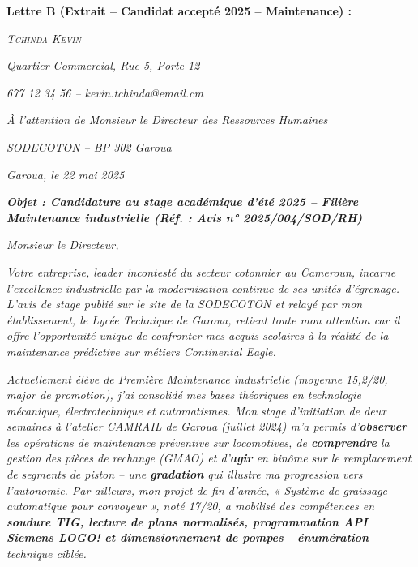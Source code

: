 \documentclass[11pt]{article}
\begin{document}
\begin{exoresolu}
\par
\textbf{Lettre B (Extrait -- Candidat accepté 2025 -- Maintenance) :}
\par
\emph{\textsc{Tchinda Kevin}}
\par
\emph{Quartier Commercial, Rue 5, Porte 12}
\par
\emph{677 12 34 56 -- kevin.tchinda@email.cm}
\par
\vspace{0.2cm}
\par
\emph{À l'attention de Monsieur le Directeur des Ressources Humaines}
\par
\emph{SODECOTON -- BP 302 Garoua}
\par
\vspace{0.2cm}
\par
\emph{Garoua, le 22 mai 2025}
\par
\vspace{0.2cm}
\par
\emph{\textbf{Objet : Candidature au stage académique d'été 2025 -- Filière Maintenance industrielle (Réf. : Avis n° 2025/004/SOD/RH)}}
\par
\vspace{0.3cm}
\par
\emph{Monsieur le Directeur,}
\par
\emph{Votre entreprise, leader incontesté du secteur cotonnier au Cameroun, incarne l'excellence industrielle par la modernisation continue de ses unités d'égrenage. L'avis de stage publié sur le site de la SODECOTON et relayé par mon établissement, le Lycée Technique de Garoua, retient toute mon attention car il offre l'opportunité unique de confronter mes acquis scolaires à la réalité de la maintenance prédictive sur métiers Continental Eagle.}
\par
\emph{Actuellement élève de Première Maintenance industrielle (moyenne 15,2/20, major de promotion), j'ai consolidé mes bases théoriques en technologie mécanique, électrotechnique et automatismes. Mon stage d'initiation de deux semaines à l'atelier CAMRAIL de Garoua (juillet 2024) m'a permis d'\textbf{observer} les opérations de maintenance préventive sur locomotives, de \textbf{comprendre} la gestion des pièces de rechange (GMAO) et d'\textbf{agir} en binôme sur le remplacement de segments de piston -- une \textbf{gradation} qui illustre ma progression vers l'autonomie. Par ailleurs, mon projet de fin d'année, « Système de graissage automatique pour convoyeur », noté 17/20, a mobilisé des compétences en \textbf{soudure TIG, lecture de plans normalisés, programmation API Siemens LOGO! et dimensionnement de pompes} -- \textbf{énumération} technique ciblée.}

\end{exoresolu}
\end{document}
